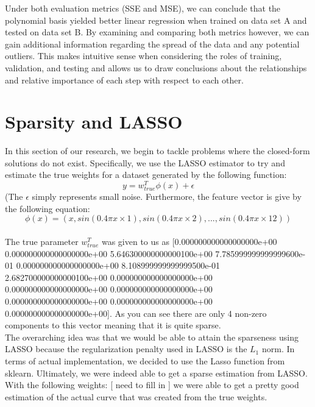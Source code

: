 \documentclass{article}
\begin{document}
Under both evaluation metrics (SSE and MSE), we can conclude that the polynomial basis yielded better linear regression when trained on data set A and tested on data set B. By examining and comparing both metrics however, we can gain additional information regarding the spread of the data and any potential outliers. This makes intuitive sense when considering the roles of training, validation, and testing and allows us to draw conclusions about the relationships and relative importance of each step with respect to each other.

\section{Sparsity and LASSO}
In this section of our research, we begin to tackle problems where the closed-form solutions do not exist. Specifically, we use the LASSO estimator to try and estimate the true weights for a dataset generated by the following function: \\ 

$$y = w^{T}_{true}\phi(x)+\epsilon$$ (The $\epsilon$ simply represents small noise. Furthermore, the feature vector is give by the following equation:\\

$$\phi(x) = (x,sin(0.4\pi x \times 1), sin(0.4\pi x \times 2), . . . , sin(0.4\pi x \times 12))$$\\

The true parameter $w^{T}_{true}$ was given to us as [0.000000000000000000e+00 0.000000000000000000e+00 5.646300000000000100e+00 7.785999999999999600e-01 0.000000000000000000e+00 8.108999999999999500e-01 2.682700000000000100e+00 0.000000000000000000e+00 0.000000000000000000e+00 0.000000000000000000e+00 0.000000000000000000e+00 0.000000000000000000e+00 0.000000000000000000e+00]. As you can see there are only 4 non-zero components to this vector meaning that it is quite sparse.\\

The overarching idea was that we would be able to attain the sparseness using LASSO because the regularization penalty used in LASSO is the $L_{1}$ norm. In terms of actual implementation, we decided to use the Lasso function from sklearn. Ultimately, we were indeed able to get a sparse estimation from LASSO. With the following weights: [ need to fill in ] we were able to get a pretty good estimation of the actual curve that was created from the true weights. 
\end{document}
